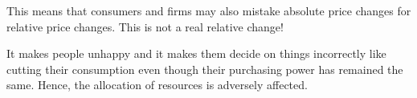 \documentclass[12pt, letterpaper]{article}
\begin{document}
This means that consumers and firms may also mistake absolute price changes for relative price changes. This is not a real relative change!
\begin{center}
\noindent{}
\end{center}
It makes people unhappy and it makes them decide on things incorrectly like cutting their consumption even though their purchasing power has remained the same. Hence, the allocation of resources is adversely affected.
\end{document}
